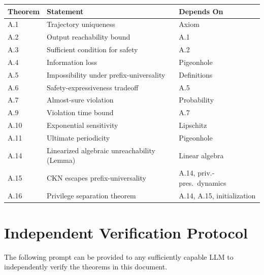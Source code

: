 \documentclass[11pt]{article}
\theoremstyle{definition}
\theoremstyle{remark}
\begin{document}
\vspace{0.5em}
\begin{center}
\begin{tabular}{lll}
\toprule
\textbf{Theorem} & \textbf{Statement} & \textbf{Depends On} \\
\midrule
A.1 & Trajectory uniqueness & Axiom \\
A.2 & Output reachability bound & A.1 \\
A.3 & Sufficient condition for safety & A.2 \\
A.4 & Information loss & Pigeonhole \\
A.5 & Impossibility under prefix-universality & Definitions \\
A.6 & Safety-expressiveness tradeoff & A.5 \\
A.7 & Almost-sure violation & Probability \\
A.9 & Violation time bound & A.7 \\
A.10 & Exponential sensitivity & Lipschitz \\
A.11 & Ultimate periodicity & Pigeonhole \\
A.14 & Linearized algebraic unreachability (Lemma) & Linear algebra \\
A.15 & CKN escapes prefix-universality & A.14, priv.-pres.\ dynamics \\
A.16 & Privilege separation theorem & A.14, A.15, initialization \\
\bottomrule
\end{tabular}
\end{center}

\section{Independent Verification Protocol}

The following prompt can be provided to any sufficiently capable LLM to independently verify the theorems in this document.
\end{document}

